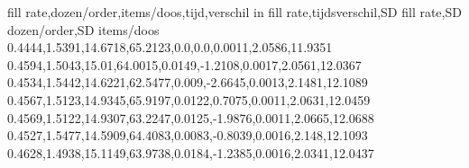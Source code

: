fill rate,dozen/order,items/doos,tijd,verschil in fill rate,tijdsverschil,SD fill rate,SD dozen/order,SD items/doos
0.4444,1.5391,14.6718,65.2123,0.0,0.0,0.0011,2.0586,11.9351
0.4594,1.5043,15.01,64.0015,0.0149,-1.2108,0.0017,2.0561,12.0367
0.4534,1.5442,14.6221,62.5477,0.009,-2.6645,0.0013,2.1481,12.1089
0.4567,1.5123,14.9345,65.9197,0.0122,0.7075,0.0011,2.0631,12.0459
0.4569,1.5122,14.9307,63.2247,0.0125,-1.9876,0.0011,2.0665,12.0688
0.4527,1.5477,14.5909,64.4083,0.0083,-0.8039,0.0016,2.148,12.1093
0.4628,1.4938,15.1149,63.9738,0.0184,-1.2385,0.0016,2.0341,12.0437
